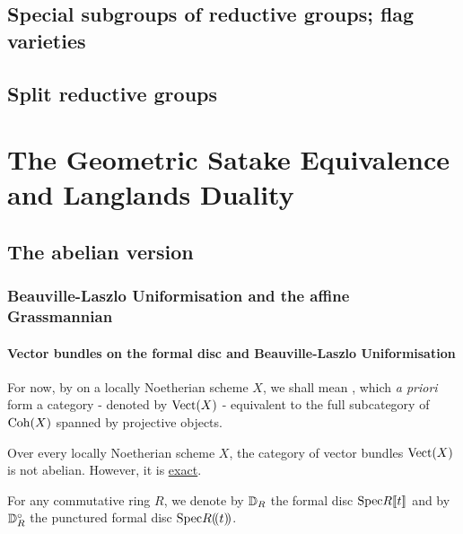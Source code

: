         \subsection{Special subgroups of reductive groups; flag varieties}
        
        \subsection{Split reductive groups}
        
    \section{The Geometric Satake Equivalence and Langlands Duality}
        \subsection{The abelian version}
            \subsubsection{Beauville-Laszlo Uniformisation and the affine Grassmannian}
                \paragraph{Vector bundles on the formal disc and Beauville-Laszlo Uniformisation}
                    \begin{convention}
                        For now, by  on a locally Noetherian scheme $X$, we shall mean , which \textit{a priori} form a category - denoted by $\mathrm{Vect}(X)$ - equivalent to the full subcategory of $\mathrm{Coh}(X)$ spanned by projective objects. 
                    \end{convention}
                    \begin{remark}
                        Over every locally Noetherian scheme $X$, the category of vector bundles $\mathrm{Vect}(X)$ is not abelian. However, it is \href{https://ncatlab.org/nlab/show/exact+category}{\underline{exact}}.
                    \end{remark}
                    
                    \begin{convention}
                        For any commutative ring $R$, we denote by $\mathbb{D}_R$ the formal disc $\mathrm{Spec} R[\![t]\!]$ and by $\mathbb{D}_R^{\circ}$ the punctured formal disc $\mathrm{Spec} R(\!(t)\!)$.
                    \end{convention}
                    
